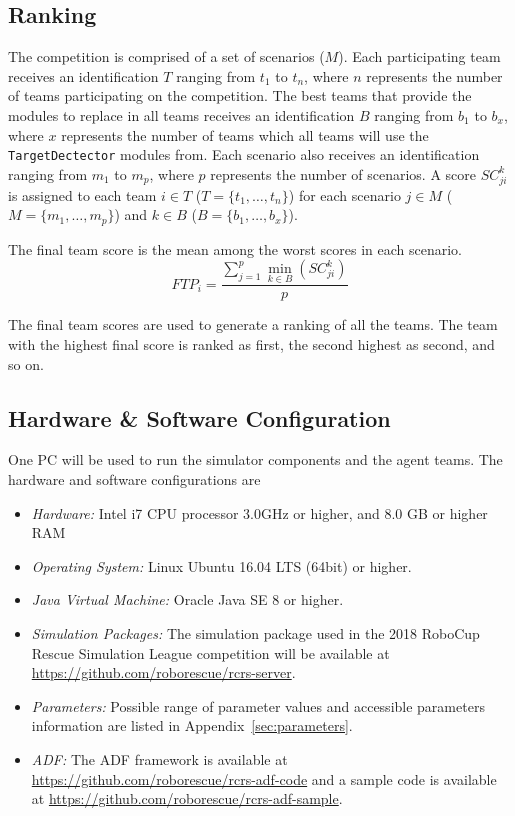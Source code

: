 \documentclass{article}
\begin{document}
\subsection{Ranking}
The competition is comprised of a set of scenarios ($M$). Each participating 
team receives an identification $T$ ranging from $t_{1}$ to $t_{n}$, where $n$ 
represents the number of teams participating on the competition. The best teams 
that provide the modules to replace in all teams receives an identification $B$ 
ranging from $b_{1}$ to $b_{x}$, where $x$ represents the number of teams which 
all teams will use the \texttt{TargetDectector} modules from. Each scenario 
also receives an identification ranging from $m_{1}$ to $m_{p}$, where $p$ 
represents the number of scenarios. A score $SC_{ji}^{k}$ is assigned to each
team $i \in T$ ($T = \{t_{1},\dots,t_{n}\}$) for each scenario $j \in M$ ($M = 
\{m_{1},\dots,m_{p}\}$) and $k \in B$ ($B = \{b_{1},\dots,b_{x}\}$).

The final team score is the mean among the worst scores in each scenario.
\begin{equation}
FTP_{i} = \frac{\sum_{j=1}^{p}{\min_{k \in B}(SC_{ji}^{k})}}{p}
\end{equation}

The final team scores are used to generate a ranking of all the teams. The team 
with the highest final score is ranked as first, the second highest as second, 
and so on.
\subsection{Hardware \& Software Configuration}
One PC will be used to run the simulator components and the agent teams. The 
hardware and software configurations are
\begin{itemize}
\item[] \emph{Hardware:} Intel i7 CPU processor 3.0GHz or higher, and 8.0 GB or 
higher RAM
\item[] \emph{Operating System:} Linux Ubuntu 16.04 LTS (64bit) or higher.
\item[] \emph{Java Virtual Machine:} Oracle Java SE 8 or higher.
\item[] \emph{Simulation Packages:} The simulation package used in the 2018 
RoboCup Rescue Simulation League competition will be available at
\url{https://github.com/roborescue/rcrs-server}.
\item[] \emph{Parameters:} Possible range of parameter values and accessible 
parameters information are listed in Appendix~\ref{sec:parameters}.
\item[] \emph{ADF:} The ADF framework is available at
\url{https://github.com/roborescue/rcrs-adf-code} and a sample code is
available at \url{https://github.com/roborescue/rcrs-adf-sample}.
\end{itemize}
\end{document}
